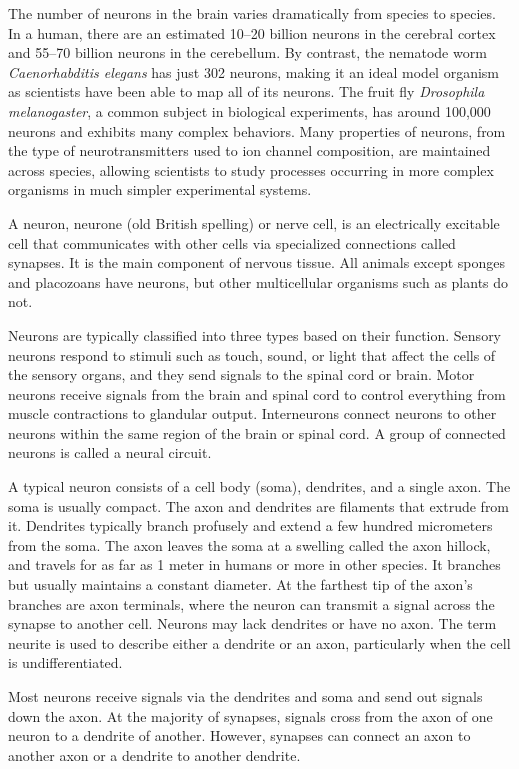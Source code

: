 The number of neurons in the brain varies dramatically from species to species. In a human, there are an estimated 10--20 billion neurons in the cerebral cortex and 55--70 billion neurons in the cerebellum. By contrast, the nematode worm \emph{Caenorhabditis elegans} has just 302 neurons, making it an ideal model organism as scientists have been able to map all of its neurons. The fruit fly \emph{Drosophila melanogaster}, a common subject in biological experiments, has around 100,000 neurons and exhibits many complex behaviors. Many properties of neurons, from the type of neurotransmitters used to ion channel composition, are maintained across species, allowing scientists to study processes occurring in more complex organisms in much simpler experimental systems.

A neuron, neurone (old British spelling) or nerve cell, is an electrically excitable cell that communicates with other cells via specialized connections called synapses. It is the main component of nervous tissue. All animals except sponges and placozoans have neurons, but other multicellular organisms such as plants do not.

Neurons are typically classified into three types based on their function. Sensory neurons respond to stimuli such as touch, sound, or light that affect the cells of the sensory organs, and they send signals to the spinal cord or brain. Motor neurons receive signals from the brain and spinal cord to control everything from muscle contractions to glandular output. Interneurons connect neurons to other neurons within the same region of the brain or spinal cord. A group of connected neurons is called a neural circuit.

A typical neuron consists of a cell body (soma), dendrites, and a single axon. The soma is usually compact. The axon and dendrites are filaments that extrude from it. Dendrites typically branch profusely and extend a few hundred micrometers from the soma. The axon leaves the soma at a swelling called the axon hillock, and travels for as far as 1 meter in humans or more in other species. It branches but usually maintains a constant diameter. At the farthest tip of the axon's branches are axon terminals, where the neuron can transmit a signal across the synapse to another cell. Neurons may lack dendrites or have no axon. The term neurite is used to describe either a dendrite or an axon, particularly when the cell is undifferentiated.

Most neurons receive signals via the dendrites and soma and send out signals down the axon. At the majority of synapses, signals cross from the axon of one neuron to a dendrite of another. However, synapses can connect an axon to another axon or a dendrite to another dendrite.

